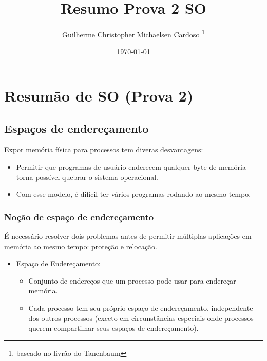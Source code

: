\documentclass[10pt]{article}
\title{Resumo Prova 2 SO}
\author{Guilherme Christopher Michaelsen Cardoso \thanks{baseado no livrão do Tanenbaum}}
\date{\today}
\begin{document}
\begin{titlepage}
    \maketitle
\end{titlepage}
\section{Resum\~ao de SO (Prova 2)} 
\subsection{Espa\c{c}os de endere\c{c}amento}
\large{Expor mem\'oria f\'isica para processos tem diveras desvantagens:}
\begin{itemize}
    \item Permitir que programas de usu\'ario enderecem qualquer byte de mem\'oria
        torna poss\'ivel quebrar o sistema operacional.
    \item Com esse modelo, \'e dificil ter v\'arios programas rodando ao mesmo tempo.
\end{itemize}
\subsubsection{No\c{c}\~ao de espa\c{c}o de endere\c{c}amento}
\'E necess\'ario resolver dois problemas antes de permitir m\'ultiplas aplica\c{c}\~oes em 
mem\'oria ao mesmo tempo: prote\c{c}\~ao e relocação.

\begin{itemize}
    \item Espaço de Endereçamento:
        \begin{itemize}
            \item Conjunto de endereços que um processo pode usar para endereçar memória.
            \item Cada processo tem seu próprio espaço de endereçamento, independente dos outros
                processos (exceto em circunstâncias especiais onde processos querem compartilhar
                seus espaços de endereçamento).
        \end{itemize}
\end{itemize}
\end{document}
